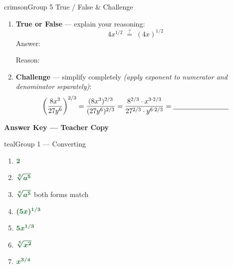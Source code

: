 \documentclass[12pt]{article}
\newcommand{\blank}{\underline{\hspace{2.8cm}}}
\newcommand{\lblank}{\underline{\hspace{4cm}}}
\begin{document}
\vspace{10pt}

\begin{pracbox}{crimson}{Group 5 \quad True / False \& Challenge}
\vspace{4pt}
\begin{enumerate}[label=\textbf{\arabic*.}, itemsep=18pt, start=20]

  \item \textbf{True or False} --- explain your reasoning:
        \[
        4x^{1/2} \;\overset{?}{=}\; (4x)^{1/2}
        \]
        \vspace{0.2cm}
        Answer:\;\lblank

        Reason:\;\lblank

  \item \textbf{Challenge} --- simplify completely
        \textit{(apply exponent to numerator and denominator separately)}:
        \[
        \left(\frac{8x^3}{27y^6}\right)^{2/3}
        = \frac{(8x^3)^{2/3}}{(27y^6)^{2/3}}
        = \frac{8^{2/3}\cdot x^{3\cdot 2/3}}{27^{2/3}\cdot y^{6\cdot 2/3}}
        = \blank
        \]

\end{enumerate}
\vspace{4pt}
\end{pracbox}

\newpage

\begin{tcolorbox}[enhanced, arc=7pt,
  colback=navy, colframe=gold, boxrule=2.8pt,
  left=14pt, right=14pt, top=10pt, bottom=10pt]
  \begin{center}
    {\color{gold}\fontsize{18}{22}\selectfont\bfseries
      Answer Key \quad --- \quad Teacher Copy}
  \end{center}
\end{tcolorbox}

\vspace{10pt}

\begin{pracbox}{teal}{Group 1 --- Converting}
\begin{enumerate}[label=\textbf{\arabic*.}, itemsep=5pt]
  \item ${\color{ansgreen}\boldsymbol{2}}$
  \item ${\color{ansgreen}\boldsymbol{\sqrt[6]{a^5}}}$
  \item ${\color{ansgreen}\boldsymbol{\sqrt[6]{a^5}}}$ \checkmark \;both forms match
  \item ${\color{ansgreen}\boldsymbol{(5x)^{1/3}}}$
  \item ${\color{ansgreen}\boldsymbol{5x^{1/3}}}$
  \item ${\color{ansgreen}\boldsymbol{\sqrt[5]{x^2}}}$
  \item ${\color{ansgreen}\boldsymbol{x^{3/4}}}$
\end{enumerate}
\end{pracbox}
\end{document}
